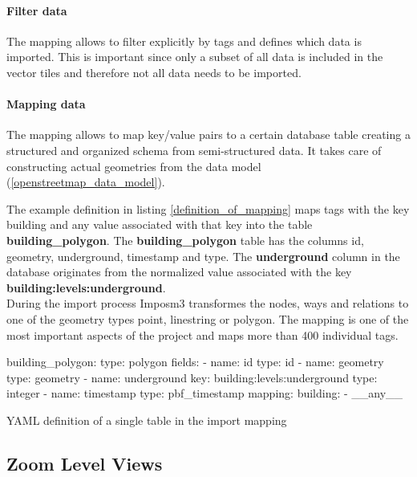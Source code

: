\paragraph{Filter data} The mapping allows to filter explicitly by tags and defines which data is imported. This is important since only a subset of all \osm{} data is included in the vector tiles and  therefore not all \osm{} data needs to be imported.

\paragraph{Mapping data} The mapping allows to map \osm{} key/value pairs to a certain database table creating a structured and organized schema from semi-structured data. It takes care of constructing actual geometries from the \osm{} data model (\autoref{openstreetmap_data_model}).

\vskip 0.2in

The example definition in listing \autoref{definition_of_mapping} maps \osm{} tags with the key building and any value associated with that key into the table \textbf{building\_polygon}. The \textbf{building\_polygon} table has the columns id, geometry, underground, timestamp and type. The \textbf{underground} column in the database originates from the normalized value associated with the \osm{} key \textbf{building:levels:underground}.\\ During the import process Imposm3 transformes the \osm{} nodes, ways and relations to one of the geometry types point, linestring or polygon. The mapping is one of the most important aspects of the project and maps more than 400 individual tags.

\begin{listing}[H]
\begin{yamlcode}
building_polygon:
  type: polygon
  fields:
  - name: id
    type: id
  - name: geometry
    type: geometry
  - name: underground
    key: building:levels:underground
    type: integer
  - name: timestamp
    type: pbf_timestamp
  mapping:
    building:
    - __any__
\end{yamlcode}
\caption{YAML definition of a single table in the import mapping}
\label{definition_of_mapping}
\end{listing}
\clearpage

\subsection{Zoom Level Views}\label{zoom_level_views}

